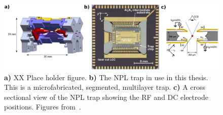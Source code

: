     \begin{figure}
        \begin{center}
        \noindent\includegraphics[width=\linewidth]{figures/png_figure/trap_comp.png}
        \end{center}
        \caption{\textbf{a)} XX Place holder figure. \textbf{b)} The NPL trap in use in this thesis. This is a microfabricated,
        segmented, multilayer trap. \textbf{c)} A cross sectional view of
        the NPL trap showing the RF and DC electrode positions.  Figures
        from~\cite{choonee_silicon_2017}.
        \label{fig:trap}}
    \end{figure}

